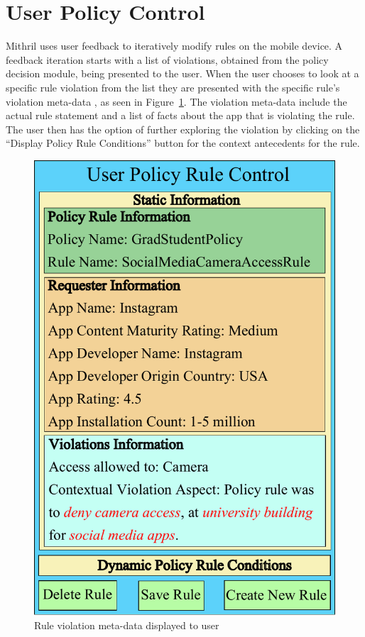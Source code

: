 \section{User Policy Control}
\label{policyControl}
Mithril uses user feedback to iteratively modify rules on the mobile device. A feedback iteration starts with a list of violations, obtained from the policy decision module, being presented to the user. When the user chooses to look at a specific rule violation from the list they are presented with the specific rule's violation meta-data , as seen in Figure~\ref{fig:architecturePolicy}. The violation meta-data include the actual rule statement and a list of facts about the app that is violating the rule. The user then has the option of further exploring the violation by clicking on the ``Display Policy Rule Conditions'' button for the context antecedents for the rule.

\begin{figure}[tb]
	\centering	\includegraphics[width=\columnwidth]{images/architecturePolicy}
	\caption{Rule violation meta-data displayed to user}
	\label{fig:architecturePolicy}
\end{figure}

